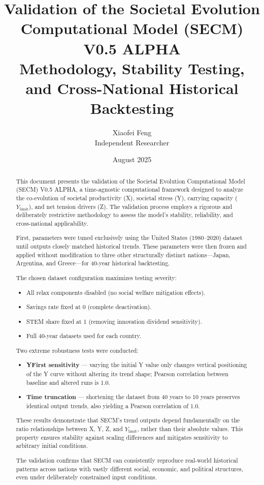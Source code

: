 \documentclass[12pt,a4paper]{article}
\title{Validation of the Societal Evolution Computational Model (SECM) V0.5 ALPHA\\
\large Methodology, Stability Testing, and Cross-National Historical Backtesting}
\author{Xiaofei Feng\\
Independent Researcher}
\date{August 2025}
\begin{document}
\maketitle

\begin{abstract}
This document presents the validation of the Societal Evolution Computational Model (SECM) V0.5 ALPHA, a time-agnostic computational framework designed to analyze the co-evolution of societal productivity (X), societal stress (Y), carrying capacity ($Y_{\text{limit}}$), and net tension drivers (Z). The validation process employs a rigorous and deliberately restrictive methodology to assess the model’s stability, reliability, and cross-national applicability.

First, parameters were tuned exclusively using the United States (1980--2020) dataset until outputs closely matched historical trends. These parameters were then frozen and applied without modification to three other structurally distinct nations---Japan, Argentina, and Greece---for 40-year historical backtesting.

The chosen dataset configuration maximizes testing severity:
\begin{itemize}
    \item All relax components disabled (no social welfare mitigation effects).
    \item Savings rate fixed at 0 (complete deactivation).
    \item STEM share fixed at 1 (removing innovation dividend sensitivity).
    \item Full 40-year datasets used for each country.
\end{itemize}

Two extreme robustness tests were conducted:
\begin{itemize}
    \item \textbf{YFirst sensitivity} --- varying the initial Y value only changes vertical positioning of the Y curve without altering its trend shape; Pearson correlation between baseline and altered runs is 1.0.
    \item \textbf{Time truncation} --- shortening the dataset from 40 years to 10 years preserves identical output trends, also yielding a Pearson correlation of 1.0.
\end{itemize}

These results demonstrate that SECM’s trend outputs depend fundamentally on the ratio relationships between X, Y, Z, and $Y_{\text{limit}}$, rather than their absolute values. This property ensures stability against scaling differences and mitigates sensitivity to arbitrary initial conditions.

The validation confirms that SECM can consistently reproduce real-world historical patterns across nations with vastly different social, economic, and political structures, even under deliberately constrained input conditions.
\end{abstract}
\end{document}
